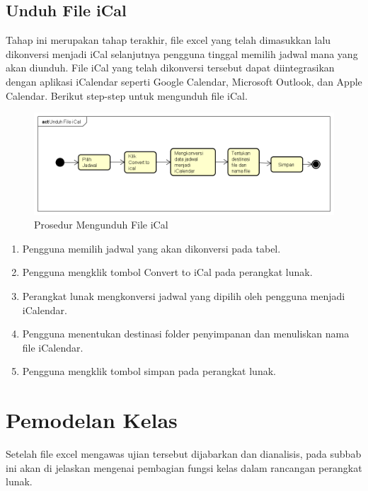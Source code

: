 \subsection{Unduh File iCal}
Tahap ini merupakan tahap terakhir, file excel yang telah dimasukkan lalu dikonversi menjadi iCal selanjutnya pengguna tinggal memilih jadwal mana yang akan diunduh. File iCal yang telah dikonversi tersebut dapat diintegrasikan dengan aplikasi iCalendar seperti Google Calendar, Microsoft Outlook, dan Apple Calendar. Berikut step-step untuk mengunduh file iCal.
\begin{figure}[h]
	\centering
	\includegraphics[scale=0.5]{Gambar/Unduh-File-iCal}
	\caption{Prosedur Mengunduh File iCal}
	\end{figure}

\begin{enumerate}
	\item Pengguna memilih jadwal yang akan dikonversi pada tabel.
	\item Pengguna mengklik tombol Convert to iCal pada perangkat lunak.
	\item Perangkat lunak mengkonversi jadwal yang dipilih oleh pengguna menjadi iCalendar.
	\item Pengguna menentukan destinasi folder penyimpanan dan menuliskan nama file iCalendar.
	\item Pengguna mengklik tombol simpan pada perangkat lunak.
\end{enumerate}

\section{Pemodelan Kelas}
Setelah file excel mengawas ujian tersebut dijabarkan dan dianalisis, pada subbab ini akan di jelaskan mengenai pembagian fungsi
kelas dalam rancangan perangkat lunak.

